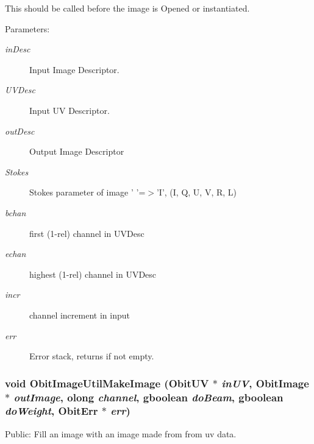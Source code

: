 This should be called before the image is Opened or instantiated. \begin{Desc}
\item[Parameters:]
\begin{description}
\item[{\em in\-Desc}]Input Image Descriptor. \item[{\em UVDesc}]Input UV Descriptor. \item[{\em out\-Desc}]Output Image Descriptor \item[{\em Stokes}]Stokes parameter of image ' '=$>$'I', (I, Q, U, V, R, L) \item[{\em bchan}]first (1-rel) channel in UVDesc \item[{\em echan}]highest (1-rel) channel in UVDesc \item[{\em incr}]channel increment in input \item[{\em err}]Error stack, returns if not empty. \end{description}
\end{Desc}
\subsubsection{\setlength{\rightskip}{0pt plus 5cm}void Obit\-Image\-Util\-Make\-Image ({\bf Obit\-UV} $\ast$ {\em in\-UV}, {\bf Obit\-Image} $\ast$ {\em out\-Image}, {\bf olong} {\em channel}, gboolean {\em do\-Beam}, gboolean {\em do\-Weight}, {\bf Obit\-Err} $\ast$ {\em err})}\label{ObitImageUtil_8c_a7}


Public: Fill an image with an image made from from uv data. 

